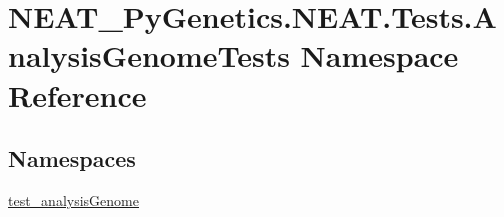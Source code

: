 \hypertarget{namespaceNEAT__PyGenetics_1_1NEAT_1_1Tests_1_1AnalysisGenomeTests}{}\section{N\+E\+A\+T\+\_\+\+Py\+Genetics.\+N\+E\+A\+T.\+Tests.\+Analysis\+Genome\+Tests Namespace Reference}
\label{namespaceNEAT__PyGenetics_1_1NEAT_1_1Tests_1_1AnalysisGenomeTests}
\subsection*{Namespaces}
\begin{DoxyCompactItemize}
\item 
 \hyperlink{namespaceNEAT__PyGenetics_1_1NEAT_1_1Tests_1_1AnalysisGenomeTests_1_1test__analysisGenome}{test\+\_\+analysis\+Genome}
\end{DoxyCompactItemize}
